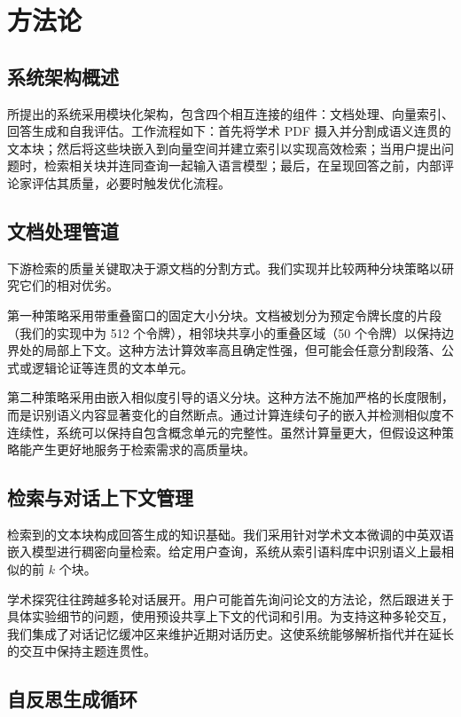 \documentclass[11pt,a4paper]{article}
\begin{document}
\section{方法论}

\subsection{系统架构概述}

所提出的系统采用模块化架构，包含四个相互连接的组件：文档处理、向量索引、回答生成和自我评估。工作流程如下：首先将学术 PDF 摄入并分割成语义连贯的文本块；然后将这些块嵌入到向量空间并建立索引以实现高效检索；当用户提出问题时，检索相关块并连同查询一起输入语言模型；最后，在呈现回答之前，内部评论家评估其质量，必要时触发优化流程。

\subsection{文档处理管道}

下游检索的质量关键取决于源文档的分割方式。我们实现并比较两种分块策略以研究它们的相对优劣。

第一种策略采用带重叠窗口的固定大小分块。文档被划分为预定令牌长度的片段（我们的实现中为 512 个令牌），相邻块共享小的重叠区域（50 个令牌）以保持边界处的局部上下文。这种方法计算效率高且确定性强，但可能会任意分割段落、公式或逻辑论证等连贯的文本单元。

第二种策略采用由嵌入相似度引导的语义分块。这种方法不施加严格的长度限制，而是识别语义内容显著变化的自然断点。通过计算连续句子的嵌入并检测相似度不连续性，系统可以保持自包含概念单元的完整性。虽然计算量更大，但假设这种策略能产生更好地服务于检索需求的高质量块。

\subsection{检索与对话上下文管理}

检索到的文本块构成回答生成的知识基础。我们采用针对学术文本微调的中英双语嵌入模型进行稠密向量检索。给定用户查询，系统从索引语料库中识别语义上最相似的前 $k$ 个块。

学术探究往往跨越多轮对话展开。用户可能首先询问论文的方法论，然后跟进关于具体实验细节的问题，使用预设共享上下文的代词和引用。为支持这种多轮交互，我们集成了对话记忆缓冲区来维护近期对话历史。这使系统能够解析指代并在延长的交互中保持主题连贯性。

\subsection{自反思生成循环}
\end{document}
